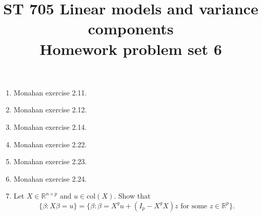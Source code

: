 \documentclass[11pt]{article}
\title{ST 705 Linear models and variance components \\ 
        Homework problem set 6}
\begin{document}
\maketitle

\begin{enumerate}

\item Monahan exercise 2.11.

\item Monahan exercise 2.12.

\item Monahan exercise 2.14.

\item Monahan exercise 2.22.

\item Monahan exercise 2.23.

\item Monahan exercise 2.24.

\item Let $X \in \mathbb{R}^{n\times p}$ and $u \in \text{col}(X)$.  Show that 
\[
\{\beta : X\beta = u\} = \{\beta : \beta = X^{g}u + (I_{p} - X^{g}X)z \text{ for some } z \in \mathbb{R}^{p}\}.
\]

\end{enumerate}
\end{document}
